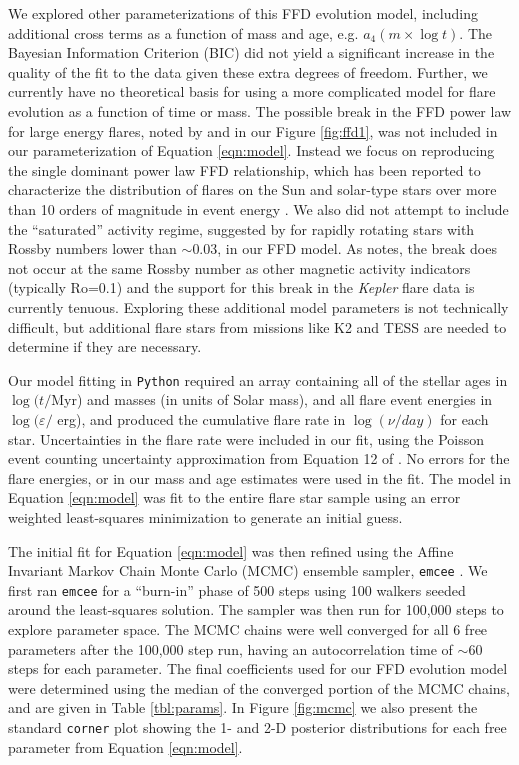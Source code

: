 \documentclass[preprint2]{aastex62}
\newcommand{\Kepler}{\textsl{Kepler}\xspace}
\begin{document}
We explored other parameterizations of this FFD evolution model, including additional cross terms as a function of mass and age, e.g. $a_4 (m \times \log t)$. The Bayesian Information Criterion (BIC) did not yield a significant increase in the quality of the fit to the data given these extra degrees of freedom. Further, we currently have no theoretical basis for using a more complicated model for flare evolution as a function of time or mass. The possible break in the FFD power law for large energy flares, noted by \citet{davenport2016} and in our Figure \ref{fig:ffd1}, was not included in our parameterization of Equation \ref{eqn:model}. Instead we focus on reproducing the single dominant power law FFD relationship, which has been reported to characterize the distribution of flares on the Sun and solar-type stars over more than 10 orders of magnitude in event energy \citep[e.g. Fig. 9 from][]{shibayama2013}. We also did not attempt to include the ``saturated'' activity regime, suggested by \citet{davenport2016} for rapidly rotating stars with Rossby numbers lower than $\sim$0.03, in our FFD model. As \citet{davenport2016} notes, the break does not occur at the same Rossby number as other magnetic activity indicators (typically Ro=0.1) and the support for this break in the \Kepler flare data is currently tenuous. Exploring these additional model parameters is not technically difficult, but additional flare stars from missions like K2 and TESS are needed to determine if they are necessary. 



Our model fitting in {\tt Python} required an array containing all of the stellar ages in $\log(t/$Myr) and masses (in units of Solar mass), and all flare event energies in $\log(\varepsilon/$ erg), and produced the cumulative flare rate in $\log (\nu/day)$ for each star. Uncertainties in the flare rate were included in our fit, using the Poisson event counting uncertainty approximation from Equation 12 of \citet{gehrels1986}. No errors for the flare energies, or in our mass and age estimates were used in the fit. The model in Equation \ref{eqn:model} was fit to the entire flare star sample using an error weighted least-squares minimization to generate an initial guess.

The initial fit for Equation \ref{eqn:model} was then refined using the Affine Invariant Markov Chain Monte Carlo (MCMC) ensemble sampler, {\tt emcee} \citep{emcee}. We first ran {\tt emcee}  for a ``burn-in'' phase of 500 steps using 100 walkers seeded around the least-squares solution. The sampler was then run for 100,000 steps to explore parameter space. The MCMC chains were well converged for all 6 free parameters after the 100,000 step run, having an autocorrelation time of $\sim$60 steps for each parameter.
The final coefficients used for our FFD evolution model were determined using the median of the converged portion of the MCMC chains, and are given in Table \ref{tbl:params}. In Figure \ref{fig:mcmc} we also present the standard {\tt corner} plot \citep{corner} showing the 1- and 2-D posterior  distributions for each free parameter from Equation \ref{eqn:model}.
\end{document}
